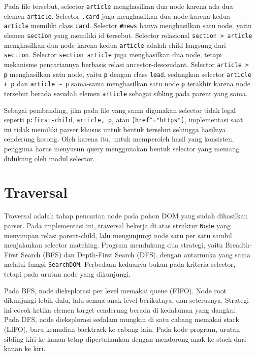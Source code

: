 Pada file tersebut, selector \texttt{article} menghasilkan dua node karena ada dua elemen \texttt{article}. Selector \texttt{.card} juga menghasilkan dua node karena kedua \texttt{article} memiliki class \texttt{card}. Selector \texttt{\#news} hanya menghasilkan satu node, yaitu elemen \texttt{section} yang memiliki id tersebut. Selector relasional \texttt{section > article} menghasilkan dua node karena kedua \texttt{article} adalah child langsung dari \texttt{section}. Selector \texttt{section article} juga menghasilkan dua node, tetapi mekanisme pencariannya berbasis relasi ancestor-descendant. Selector \texttt{article > p} menghasilkan satu node, yaitu \texttt{p} dengan class \texttt{lead}, sedangkan selector \texttt{article + p} dan \texttt{article \textasciitilde{} p} sama-sama menghasilkan satu node \texttt{p} terakhir karena node tersebut berada sesudah elemen \texttt{article} sebagai sibling pada parent yang sama.

Sebagai pembanding, jika pada file yang sama digunakan selector tidak legal seperti \texttt{p:first-child}, \texttt{article, p}, atau \texttt{[href\textasciicircum{}="https"]}, implementasi saat ini tidak memiliki parser khusus untuk bentuk tersebut sehingga hasilnya cenderung kosong. Oleh karena itu, untuk memperoleh hasil yang konsisten, pengguna harus menyusun query menggunakan bentuk selector yang memang didukung oleh modul selector.

\section{Traversal}

Traversal adalah tahap pencarian node pada pohon DOM yang sudah dihasilkan parser. Pada implementasi ini, traversal bekerja di atas struktur \texttt{Node} yang menyimpan relasi parent-child, lalu mengunjungi node satu per satu sambil menjalankan selector matching. Program mendukung dua strategi, yaitu Breadth-First Search (BFS) dan Depth-First Search (DFS), dengan antarmuka yang sama melalui fungsi \texttt{SearchDOM}. Perbedaan keduanya bukan pada kriteria selector, tetapi pada urutan node yang dikunjungi.

Pada BFS, node dieksplorasi per level memakai queue (FIFO). Node root dikunjungi lebih dulu, lalu semua anak level berikutnya, dan seterusnya. Strategi ini cocok ketika elemen target cenderung berada di kedalaman yang dangkal. Pada DFS, node dieksplorasi sedalam mungkin di satu cabang memakai stack (LIFO), baru kemudian backtrack ke cabang lain. Pada kode program, urutan sibling kiri-ke-kanan tetap dipertahankan dengan mendorong anak ke stack dari kanan ke kiri.


